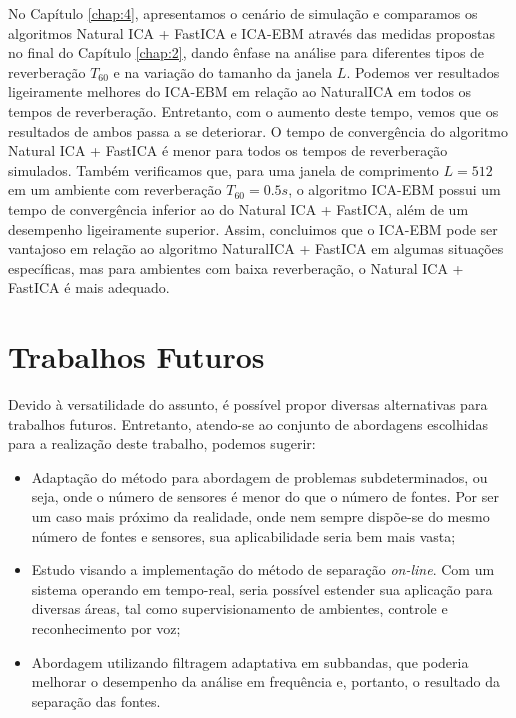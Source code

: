 No Capítulo \ref{chap:4}, apresentamos o cenário de simulação e comparamos os algoritmos Natural ICA + FastICA e ICA-EBM através das medidas propostas no final do Capítulo \ref{chap:2}, dando ênfase na análise para diferentes tipos de reverberação $T_{60}$ e na variação do tamanho da janela $L$. Podemos ver resultados ligeiramente melhores do ICA-EBM em relação ao NaturalICA em todos os tempos de reverberação. Entretanto, com o aumento deste tempo, vemos que os resultados de ambos passa a se deteriorar. O tempo de convergência do algoritmo Natural ICA + FastICA é menor para todos os tempos de reverberação simulados. Também verificamos que, para uma janela de comprimento $L=512$ em um ambiente com reverberação $T_{60}=0.5s$, o algoritmo ICA-EBM possui um tempo de convergência inferior ao do Natural ICA + FastICA, além de um desempenho ligeiramente superior. Assim, concluimos que o ICA-EBM pode ser vantajoso em relação ao algoritmo NaturalICA + FastICA em algumas situações específicas, mas para ambientes com baixa reverberação, o Natural ICA + FastICA é mais adequado.

\section{Trabalhos Futuros}

Devido à versatilidade do assunto, é possível propor diversas alternativas para trabalhos futuros. Entretanto, atendo-se ao conjunto de abordagens escolhidas para a realização deste trabalho, podemos sugerir:
\begin{itemize}
    \item Adaptação do método para abordagem de problemas subdeterminados, ou seja, onde o número de sensores é menor do que o número de fontes. Por ser um caso mais próximo da realidade, onde nem sempre dispõe-se do mesmo número de fontes e sensores, sua aplicabilidade seria bem mais vasta;
    
    \item Estudo visando a implementação do método de separação \textit{on-line}. Com um sistema operando em tempo-real, seria possível estender sua aplicação para diversas áreas, tal como supervisionamento de ambientes, controle e reconhecimento por voz;
    
    \item Abordagem utilizando filtragem adaptativa em subbandas, que poderia melhorar o desempenho da análise em frequência e, portanto, o resultado da separação das fontes.
\end{itemize}
